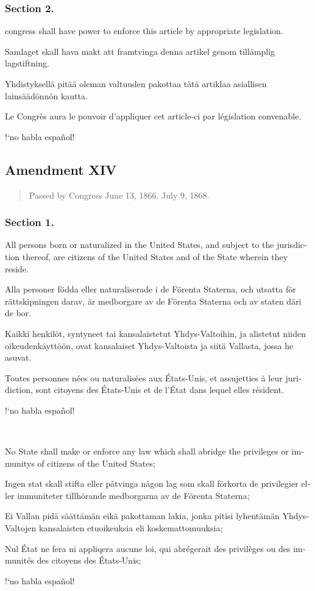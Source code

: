 \documentclass[a4paper,landscape,10pt]{article}
\newcommand{\tblock}[5]{\noindent\begin{minipage}[t]{0.18\textwidth}\foreignlanguage{english}{#1}\end{minipage}\hskip 0.025\textwidth\begin{minipage}[t]{0.18\textwidth}\foreignlanguage{swedish}{#2}\end{minipage}\hskip 0.025\textwidth\begin{minipage}[t]{0.18\textwidth}\foreignlanguage{finnish}{#3}\end{minipage}\hskip 0.025\textwidth\begin{minipage}[t]{0.18\textwidth}\foreignlanguage{french}{#4}\end{minipage}\hskip 0.025\textwidth\begin{minipage}[t]{0.18\textwidth}\foreignlanguage{spanish}{#5}\end{minipage}}
\begin{document}
\subsubsection*{Section 2.}
\tblock
{\Gls{congress} shall have power to enforce this article by appropriate legislation.}
{Samlaget skall hava makt att framtvinga denna artikel genom tillämplig lagstiftning.}
{Yhdistyksellä pitää oleman valtuuden pakottaa tätä artiklaa asiallisen lainsäädönnön kautta.}
{Le Congrès aura le pouvoir d'appliquer cet article-ci par législation convenable.}
{!`no habla español!}



\subsection*{Amendment XIV}
\begin{quote}\small
	Passed by Congress June 13, 1866.  July 9, 1868.
\end{quote}
\subsubsection*{Section 1.}
\tblock
{All persons born or naturalized in the United States, and subject to the jurisdiction thereof, are citizens of the United States and of the State wherein they reside.}
{Alla personer födda eller naturaliserade i de Förenta Staterna, och utsatta för rättskipningen darav, är medborgare av de Förenta Staterna och av staten däri de bor.}
{Kaikki henkilöt, syntyneet tai kansalaistetut Yhdys-Valtoihin, ja alistetut niiden oikeudenkäyttöön, ovat kansalaiset Yhdys-Valtoista ja siitä Vallasta, jossa he asuvat.}
{Toutes personnes nées ou naturalisées aux États-Unis, et assujetties à leur juridiction, sont citoyens des États-Unis et de l'État dans lequel elles résident.}
{!`no habla español!}

~

\tblock
{No State shall make or enforce any law which shall \gls{abridge} the \glspl{privilege} or \glspl{immunity} of citizens of the United States;}
{Ingen stat skall stifta eller påtvinga någon lag som skall förkorta de privilegier eller immuniteter tillhörande medborgarna av de Förenta Staterna;}
{Ei Vallan pidä säättämän eikä pakottaman lakia, jonka pitisi lyhentämän Yhdys-Valtojen kansalaisten etuoikeuksia eli koskemattomuuksia;}
{Nul État ne fera ni appliqera aucune loi, qui abrégerait des privilèges ou des immunités des citoyens des États-Unis;}
{!`no habla español!}
\end{document}
